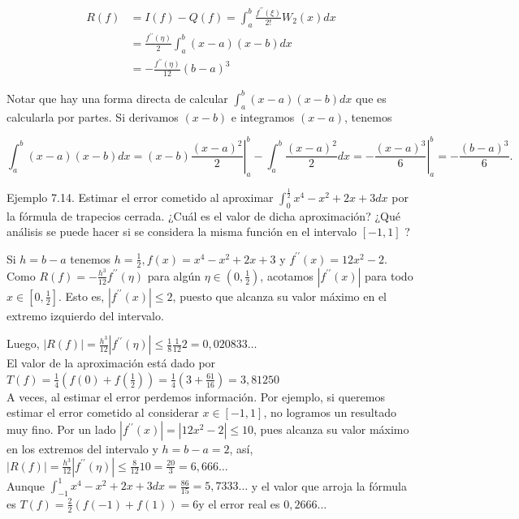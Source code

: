 \documentclass[10pt]{book}
\begin{document}
$$
\begin{aligned}
R(f) & =I(f)-Q(f)=\int_{a}^{b} \frac{f^{\prime \prime}(\xi)}{2!} W_{2}(x) d x \\
& =\frac{f^{\prime \prime}(\eta)}{2} \int_{a}^{b}(x-a)(x-b) d x \\
& =-\frac{f^{\prime \prime}(\eta)}{12}(b-a)^{3}
\end{aligned}
$$

Notar que hay una forma directa de calcular $\int_{a}^{b}(x-a)(x-b) d x$ que es calcularla por partes. Si derivamos $(x-b)$ e integramos $(x-a)$, tenemos

$$
\int_{a}^{b}(x-a)(x-b) d x=\left.(x-b) \frac{(x-a)^{2}}{2}\right|_{a} ^{b}-\int_{a}^{b} \frac{(x-a)^{2}}{2} d x=-\left.\frac{(x-a)^{3}}{6}\right|_{a} ^{b}=-\frac{(b-a)^{3}}{6} .
$$

Ejemplo 7.14. Estimar el error cometido al aproximar $\int_{0}^{\frac{1}{2}} x^{4}-x^{2}+2 x+3 d x$ por la fórmula de trapecios cerrada. ¿Cuál es el valor de dicha aproximación? ¿Qué análisis se puede hacer si se considera la misma función en el intervalo $[-1,1]$ ?

Si $h=b-a$ tenemos $h=\frac{1}{2}, f(x)=x^{4}-x^{2}+2 x+3$ y $f^{\prime \prime}(x)=12 x^{2}-2$. Como $R(f)=-\frac{h^{3}}{12} f^{\prime \prime}(\eta)$ para algún $\eta \in\left(0, \frac{1}{2}\right)$, acotamos $\left|f^{\prime \prime}(x)\right|$ para todo $x \in\left[0, \frac{1}{2}\right]$. Esto es, $\left|f^{\prime \prime}(x)\right| \leq 2$, puesto que alcanza su valor máximo en el extremo izquierdo del intervalo.

Luego, $|R(f)|=\frac{h^{3}}{12}\left|f^{\prime \prime}(\eta)\right| \leq \frac{1}{8} \frac{1}{12} 2=0,020833 \ldots$\\
El valor de la aproximación está dado por $T(f)=\frac{1}{4}\left(f(0)+f\left(\frac{1}{2}\right)\right)=\frac{1}{4}\left(3+\frac{61}{16}\right)=3,81250$\\
A veces, al estimar el error perdemos información. Por ejemplo, si queremos estimar el error cometido al considerar $x \in[-1,1]$, no logramos un resultado muy fino. Por un lado $\left|f^{\prime \prime}(x)\right|= \left|12 x^{2}-2\right| \leq 10$, pues alcanza su valor máximo en los extremos del intervalo y $h=b-a=2$, así,\\
$|R(f)|=\frac{h^{3}}{12}\left|f^{\prime \prime}(\eta)\right| \leq \frac{8}{12} 10=\frac{20}{3}=6,666 \ldots$\\
Aunque $\int_{-1}^{1} x^{4}-x^{2}+2 x+3 d x=\frac{86}{15}=5,7333 \ldots$ y el valor que arroja la fórmula es $T(f)= \frac{2}{2}(f(-1)+f(1))=6 \mathrm{y}$ el error real es $0,2666 \ldots$
\end{document}
